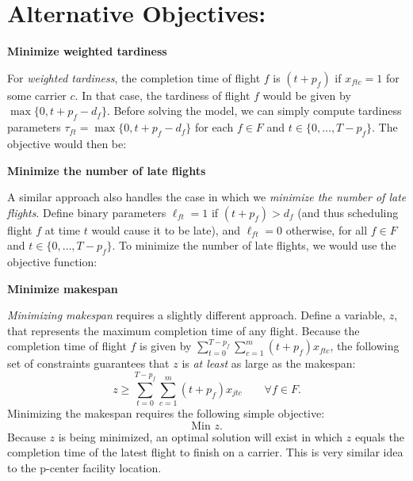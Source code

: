 \documentclass[11pt]{article}
\theoremstyle{definition}
\begin{document}
\section{Alternative Objectives:}

\textbf{Minimize weighted tardiness}

For \emph{weighted tardiness}, the completion time of flight $f$ is $(t + p_f)$ if $x_{ftc} = 1$ for some carrier $c$. In that case, the tardiness of flight $f$ would be given by $\max\{0,t + p_f - d_f\}$. Before solving the model, we can simply compute tardiness parameters $\tau_{ft} = \max\{0,t + p_f - d_f\}$ for each $f \in F$ and $t \in \{0,\ldots,T-p_f\}$. The objective would then be:
\vfill

\textbf{Minimize the number of late flights}

A similar approach also handles the case in which we \emph{minimize the number of late flights}. Define binary parameters $\ell_{ft} = 1$ if $(t + p_f) > d_f$ (and thus scheduling flight $f$ at time $t$ would cause it to be late), and $\ell_{ft} = 0$ otherwise, for all $f \in F$ and $t \in \{0,\ldots,T-p_f\}$. To minimize the number of late flights, we would use the objective function:
\vfill

\textbf{Minimize makespan}

\emph{Minimizing makespan} requires a slightly different approach. Define a variable, $z$, that represents the maximum completion time of any flight. Because the completion time of flight $f$ is given by $\sum_{t = 0}^{T-p_f} \sum_{c = 1}^m (t + p_f)x_{ftc}$, the following set of constraints guarantees that $z$ is \emph{at least} as large as the makespan:
\begin{equation} \label{e:basics3objmm_makespancon}
z \ge \sum_{t = 0}^{T-p_f} \sum_{c = 1}^m (t + p_f)x_{jtc} \qquad \forall f \in F.
\end{equation}
Minimizing the makespan requires the following simple objective:
\begin{equation} \label{e:basics3objmm_makespanobj}
\textrm{Min } z.
\end{equation}
Because $z$ is being minimized, an optimal solution will exist in which $z$ equals the completion time of the latest flight to finish on a carrier. This is very similar idea to the p-center facility location.
\end{document}

